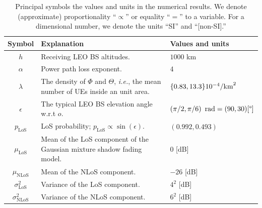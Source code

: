 \documentclass[lettersize,journal]{IEEEtran}
\newcommand{\rEarth}{R_{\oplus}}
\newcommand{\R}{\mathbb{R}}
\begin{document}
\begin{table}
   \captionsetup{size=footnotesize}
   \caption{Principal symbols the values and units in the numerical results. We denote (approximate) proportionality ``$\propto$'' or equality ``$=$'' to a variable. For a dimensional number, we denote the units ``SI'' and ``[non-SI].''}
     \label{table:parameters}
  \begin{center}
    \begin{tabular}{c|p{4.5cm}|p{1.9cm}}
      \toprule
      Symbol& Explanation &Values and units
      \\ 
      \hline 
      $h$ & Receiving LEO BS altitudes. &$1000$ km  \\
      $\alpha$ &Power path loss exponent.& $4$\\
      $\lambda$ & The density of $\Phi$ and $\Theta$, \textit{i.e.}, the mean number of UEs inside an unit area.&$\{0.83,13.3\} \break 10^{-4}\text{/km}^2$\\
      $\epsilon$& The typical LEO BS elevation angle w.r.t $\textit{o}$.&$\left({\pi}/{2},{\pi}/{6}\right)\text{ rad}\break=(90,30)[\degree]$\\
      $p_{\text{LoS}}$& LoS probability; $p_{\text{LoS}} \propto \sin(\epsilon)$. & $(0.992,0.493)$\\
      $\mu_{\text{LoS}}$& Mean of the LoS component of the Gaussian mixture shadow fading model. & $0$ [dB] \\
      $\mu_{\text{NLoS}}$& Mean of the NLoS component. & $-26$ [dB] \\
      $\sigma^2_{\text{LoS}}$& Variance of the LoS component. & $4^2$ [dB] \\
      $\sigma^2_{\text{NLoS}}$& Variance of the NLoS component. & $6^2$ [dB] \\

\end{tabular}
\end{center}
\end{table}
\end{document}

